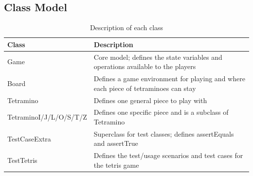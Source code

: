 \documentclass[a4paper]{article}
\begin{document}
\subsection{Class Model}
\begin{table}[H]
	\centering
	\label{description-classes}
	\begin{tabular}{|l|p{8cm}|}
	\hline
	\textbf{Class} 			   & \textbf{Description}	\\	\hline
	Game		   			   &	Core model; defines the state variables and operations available to the players	\\	\hline
	Board		   			   &	Defines a game environment for playing and where each piece of tetraminoes can stay \\	\hline
	Tetramino	   			   &	Defines one general piece to play with	\\	\hline
	TetraminoI/J/L/O/S/T/Z	   &	Defines one specific piece and is a subclass of Tetramino \\	\hline
	TestCaseExtra  			   &	Superclass for test classes; defines assertEquals and assertTrue	\\	\hline
	TestTetris	   			   &	Defines the test/usage scenarios and test cases for the tetris game	\\	\hline
	\end{tabular}
	\caption{Description of each class}
\end{table}
\end{document}
